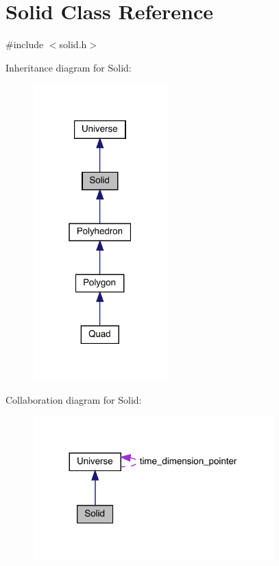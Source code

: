 \hypertarget{class_solid}{}\section{Solid Class Reference}
\label{class_solid}


{\ttfamily \#include $<$solid.\+h$>$}



Inheritance diagram for Solid\+:\nopagebreak
\begin{figure}[H]
\begin{center}
\leavevmode
\includegraphics[width=147pt]{class_solid__inherit__graph}
\end{center}
\end{figure}


Collaboration diagram for Solid\+:\nopagebreak
\begin{figure}[H]
\begin{center}
\leavevmode
\includegraphics[width=263pt]{class_solid__coll__graph}
\end{center}
\end{figure}
